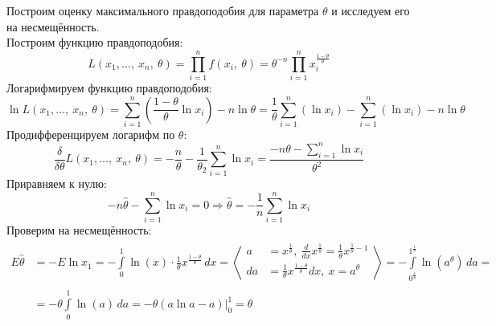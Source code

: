\documentclass[12pt, a4paper]{article}
\begin{document}
Построим оценку максимального правдоподобия для параметра $\theta$ и исследуем его на несмещённость.\\
Построим функцию правдоподобия:
\begin{equation*}
    L(x_1,\dots,\ x_n,\ \theta) = \prod_{i = 1}^{n} f(x_i,\ \theta) = \theta^{-n} \prod_{i = 1}^{n} x_i^{\frac{1 - \theta}{\theta}}
\end{equation*}
Логарифмируем функцию правдоподобия:
\begin{equation*}
    \ln L(x_1,\dots,\ x_n,\ \theta) = \sum_{i = 1}^{n} \left(\frac{1 - \theta}{\theta} \ln x_i\right) -n\ln \theta = \frac{1}{\theta} \sum_{i = 1}^{n} (\ln x_i) - \sum_{i = 1}^{n} (\ln x_i) - n \ln \theta
\end{equation*}
Продифференцируем логарифм по $\theta$:
\begin{equation*}
    \frac{\delta}{\delta \theta} L(x_1,\dots,\ x_n,\ \theta) = - \frac{n}{\theta} - \frac{1}{\theta_2} \sum_{i = 1}^{n} \ln x_i = \dfrac{-n\theta - \sum\limits_{i = 1}^{n} \ln x_i}{\theta^2}
\end{equation*}
Приравняем к нулю:
\begin{equation*}
    -n\hat\theta - \sum_{i = 1}^{n} \ln x_i = 0\Rightarrow \hat\theta = - \frac{1}{n} \sum_{i = 1}^{n} \ln x_i
\end{equation*}
Проверим на несмещённость:
\begin{equation*}
    \begin{aligned}
        E\hat\theta & = -E\ln x_1 = -\int\limits_0^1\ln (x) \cdot \frac{1}{\theta}x^{\frac{1 - \theta}{\theta}}\, dx = \left<\begin{aligned}
                                                                                                                                 a  & = x^{\frac{1}{\theta}},\ \frac{d}{dx} x^{\frac{1}{\theta}} = \frac{1}{\theta} x^{\frac{1}{\theta} - 1} \\
                                                                                                                                 da & = \frac{1}{\theta}x^{\frac{1 - \theta}{\theta}}dx,\ x = a^{\theta}                                     \\
                                                                                                                             \end{aligned}  \right> = -\int\limits_{0^{\frac{1}{\theta}}}^{1^{\frac{1}{\theta}}} \ln(a^{\theta})\, da = \\
                    & = -\theta \int\limits_0^1 \ln (a)\, da = -\theta \left( a\ln a - a \right)\Big|_0^1 = \theta
    \end{aligned}
\end{equation*}
\end{document}
